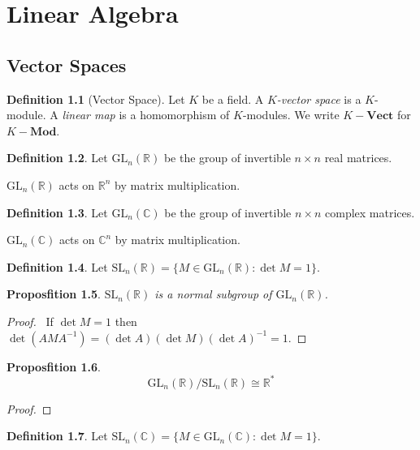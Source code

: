 \documentclass{book}
\let\qed\relax
\newtheorem{prop}{Proposfition}[chapter]
\theoremstyle{definition}
\newtheorem{df}[prop]{Definition}
\newcommand{\Mod}[1]{\ensuremath{{#1}-\mathbf{Mod}}}
\begin{document}
\part{Linear Algebra}

\chapter{Vector Spaces}

\begin{df}[Vector Space]
Let $K$ be a field. A \emph{$K$-vector space} is a $K$-module. A \emph{linear map} is a homomorphism of $K$-modules. We write $K-\mathbf{Vect}$ for $\Mod{K}$.
\end{df}

\begin{df}
    Let $\mathrm{GL}_n(\mathbb{R})$ be the group of invertible $n \times n$ real matrices.
    
    $\mathrm{GL}_n(\mathbb{R})$ acts on $\mathbb{R}^n$ by matrix multiplication.
\end{df}

\begin{df}
    Let $\mathrm{GL}_n(\mathbb{C})$ be the group of invertible $n \times n$ complex matrices.
    
    $\mathrm{GL}_n(\mathbb{C})$ acts on $\mathbb{C}^n$ by matrix multiplication.
\end{df}

\begin{df}
Let $\mathrm{SL}_n(\mathbb{R}) = \{ M \in \mathrm{GL}_n(\mathbb{R}) : \det M = 1 \}$.
\end{df}

\begin{prop}
$\mathrm{SL}_n(\mathbb{R})$ is a normal subgroup of $\mathrm{GL}_n(\mathbb{R})$.
\end{prop}

\begin{proof}
\pf\ If $\det M = 1$ then $\det(AMA^{-1}) = (\det A) (\det M) (\det A)^{-1} = 1$. \qed
\end{proof}

\begin{prop}
\[ \mathrm{GL}_n(\mathbb{R}) / \mathrm{SL}_n(\mathbb{R}) \cong \mathbb{R}^* \]
\end{prop}

\begin{proof}
\end{proof}

\begin{df}
Let $\mathrm{SL}_n(\mathbb{C}) = \{ M \in \mathrm{GL}_n(\mathbb{C}) : \det M = 1 \}$.
\end{df}
\end{document}
